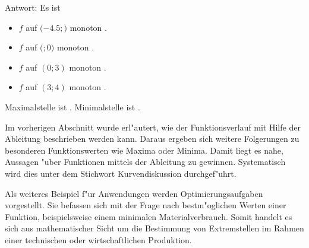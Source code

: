 \begin{MExercises}
\begin{MExercise}
Antwort: Es ist
\begin{itemize}
\item $f$ auf $(-4.5; $$)$ monoton 
.
%
\item $f$ auf $($$; 0)$ monoton 
.
%
\item $f$ auf $(0; 3)$ monoton .
%
\item $f$ auf $(3; 4)$ monoton .
\end{itemize}
Maximalstelle ist .
Minimalstelle ist .
\end{MExercise}
\end{MExercises}




\begin{MIntro}
Im vorherigen Abschnitt wurde erl"autert, wie der Funktionsverlauf mit Hilfe
der Ableitung beschrieben werden kann. Daraus ergeben sich weitere Folgerungen
zu besonderen Funktionswerten wie Maxima oder Minima. 
Damit liegt es nahe, Aussagen "uber Funktionen mittels der Ableitung zu 
gewinnen. Systematisch wird dies unter dem Stichwort Kurvendiskussion
durchgef"uhrt. 

Als weiteres Beispiel f"ur Anwendungen werden Optimierungsaufgaben vorgestellt. 
Sie befassen sich mit der Frage nach bestm"oglichen Werten einer Funktion, 
beispielsweise einem minimalen Materialverbrauch. Somit handelt es sich aus 
mathematischer Sicht um die Bestimmung von Extremstellen im Rahmen einer 
technischen oder wirtschaftlichen Produktion.
\end{MIntro}




